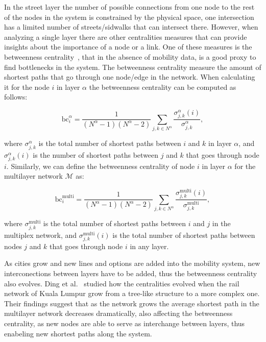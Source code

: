 In the street layer the number of possible connections from one node to the rest of the nodes in the system is constrained by the physical space, one intersection has a limited number of streets/sidwalks that can intersect there. However, when analyzing a single layer there are other centralities measures that can provide insights about the importance of a node or a link. One of these measures is the betweenness centrality~\cite{Freeman1977Centrality}, that in the absence of mobility data, is a good proxy to find bottlenecks in the system. The betweenness centrality measure the amount of shortest paths that go through one node/edge in the network. When calculating it for the node $i$ in layer $\alpha$ the betweenness centrality can be computed as follows:

\begin{equation}
     \text{bc}_i^\alpha=\frac{1}{(N^\alpha-1)(N^\alpha-2)}\sum_{j,k\in N^\alpha}\frac{\sigma_{j,k}^\alpha(i)}{\sigma_{j,k}^\alpha}, 
 \end{equation}

where $\sigma_{j,k}^\alpha$ is the total number of shortest paths between $i$ and $k$ in layer $\alpha$, and $\sigma_{j,k}^\alpha(i)$ is the number of shortest paths between $j$ and $k$ that goes through node $i$. Similarly, we can define the betweenness centrality of node $i$ in layer $\alpha$ for the multilayer network $\mathcal{M}$ as:

\begin{equation}
     \text{bc}_i^\text{multi}=\frac{1}{(N^\alpha-1)(N^\alpha-2)}\sum_{j,k\in N^\alpha}\frac{\sigma_{j,k}^\text{multi}(i)}{\sigma_{j,k}^\text{multi}}, 
\end{equation}

where $\sigma_{j,k}^\text{multi}$ is the total number of shortest paths between $i$ and $j$ in the multiplex network, and $\sigma_{j,k}^\text{multi}(i)$ is the total number of shortest paths between nodes $j$ and $k$ that goes through node $i$ in any layer.

As cities grow and new lines and options are added into the mobility system, new interconections between layers have to be added, thus the betweenness centrality also evolves. Ding et al.~\cite{ding2018traffic} studied how the centralities evolved when the rail network of Kuala Lumpur grow from a tree-like structure to a more complex one. Their findings suggest that as the network grows the average shortest path in the multilayer network decreases dramatically, also affecting the betweenness centrality, as new nodes are able to serve as interchange between layers, thus enabeling new shortest paths along the system.

